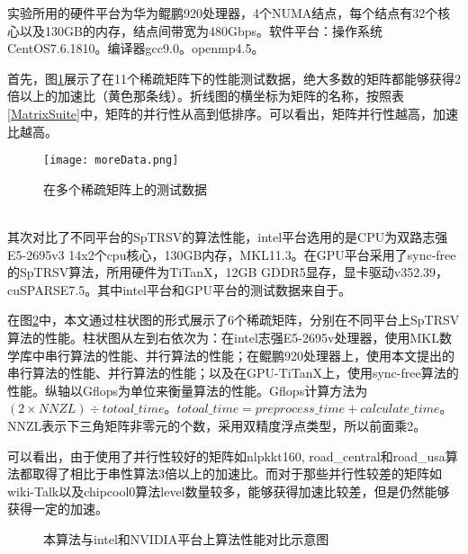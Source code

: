 实验所用的硬件平台为华为鲲鹏920处理器，4个NUMA结点，每个结点有32个核心以及130GB的内存，结点间带宽为480Gbps。软件平台：操作系统CentOS7.6.1810。编译器gcc9.0。openmp4.5。

首先，图\ref{在多个稀疏矩阵上的测试数据}展示了在11个稀疏矩阵下的性能测试数据，绝大多数的矩阵都能够获得2倍以上的加速比（黄色那条线）。折线图的横坐标为矩阵的名称，按照表\ref{MatrixSuite}中，矩阵的并行性从高到低排序。可以看出，矩阵并行性越高，加速比越高。
\begin{figure}[htbp]
    \centering
    \texttt{[image: moreData.png]}
    \caption{在多个稀疏矩阵上的测试数据}
    \label{在多个稀疏矩阵上的测试数据}
\end{figure}

~\\

其次对比了不同平台的SpTRSV的算法性能，intel平台选用的是CPU为双路志强E5-2695v3 14x2个cpu核心，130GB内存，MKL11.3。在GPU平台采用了sync-free\cite{liuSyncFree2016}的SpTRSV算法，所用硬件为TiTanX，12GB GDDR5显存，显卡驱动v352.39，cuSPARSE7.5。其中intel平台和GPU平台的测试数据来自于\cite{liuSyncFree2016}。

在图\ref{SpTRSVMulti-paltform}中，本文通过柱状图的形式展示了6个稀疏矩阵，分别在不同平台上SpTRSV算法的性能。柱状图从左到右依次为：在intel志强E5-2695v处理器，使用MKL数学库中串行算法的性能、并行算法的性能；在鲲鹏920处理器上，使用本文提出的串行算法的性能、并行算法的性能；以及在GPU-TiTanX上，使用sync-free算法的性能。纵轴以Gflops为单位来衡量算法的性能。Gflops计算方法为$(2 \times NNZL)  \div totoal\_time$。$totoal\_time = preprocess\_time + calculate\_time$。NNZL表示下三角矩阵非零元的个数，采用双精度浮点类型，所以前面乘2。

可以看出，由于使用了并行性较好的矩阵如nlpkkt160, road\_central和road\_usa算法都取得了相比于串性算法3倍以上的加速比。而对于那些并行性较差的矩阵如wiki-Talk以及chipcool0算法level数量较多，能够获得加速比较差，但是仍然能够获得一定的加速。

\begin{figure}[htbp]
    \centering
    \quad
    \quad
    \quad
    \quad
    \quad
    \caption{本算法与intel和NVIDIA平台上算法性能对比示意图}
    \label{SpTRSVMulti-paltform}
\end{figure}

